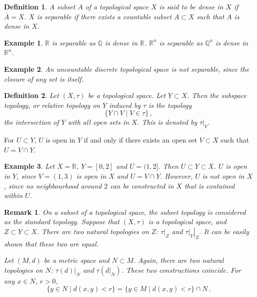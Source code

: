 \documentclass{article}
\theoremstyle{plain}\theoremheaderfont{\normalfont\itshape}\theorembodyfont{\rmfamily}\theoremseparator{.}\newtheorem*{rem}{Remark}\newtheorem*{ex}{Example}\newtheorem*{proof}{Proof}\newtheorem*{altp}{Alternative proof}
\theoremstyle{plain}\theoremheaderfont{\normalfont\bfseries}\theorembodyfont{\rmfamily}\theoremseparator{.}\newtheorem{thm}{Theorem}[section]\newtheorem{lem}[thm]{Lemma}\newtheorem{prop}[thm]{Proposition}\newtheorem*{cor}{Corollary}\newtheorem{defn}[thm]{Definition}\newtheorem{clm}[thm]{Claim}\newtheorem{clminproof}{Claim}
\theoremstyle{break}\theoremheaderfont{\normalfont\itshape}\theorembodyfont{\rmfamily}\theoremseparator{.\medskip}\newtheorem*{proofskip}{Proof}\newtheorem*{exs}{Examples}\newtheorem*{rems}{Remarks}
\theoremstyle{break}\theoremheaderfont{\normalfont\bfseries}\theorembodyfont{\rmfamily}\theoremseparator{.\medskip}\newtheorem{lemskip}[thm]{Lemma}\newtheorem{defnskip}[thm]{Definition}\newtheorem{propskip}[thm]{Proposition}\newtheorem{thmskip}[thm]{Theorem}
\begin{document}
    \begin{defn}
        A subset \(A\) of a topological space \(X\) is said to be \textit{dense} in \(X\) if \(\bar{A}=X\). \(X\) is \textit{separable} if there exists a countable subset \(A\subset X\) such that \(A\) is dense in \(X\).
    \end{defn}
    \begin{ex}
        \(\mathbb{R}\) is separable as \(\mathbb{Q}\) is dense in \(\mathbb{R}\). \(\mathbb{R}^n\) is separable as \(\mathbb{Q}^n\) is dense in \(\mathbb{R}^n\).
    \end{ex}

    \begin{ex}
        An uncountable discrete topological space is not separable, since the closure of any set is itself.
    \end{ex}

    \begin{defn}
        Let \((X,\tau)\) be a topological space. Let \(Y\subset X\). Then the \textit{subspace topology}, or \textit{relative topology} on \(Y\) induced by \(\tau\) is the topology
        \[\{Y\cap V\mid V\in\tau\}\,,\]
        the intersection of \(Y\) with all open sets in \(X\). This is denoted by \(\tau|_Y\).
    \end{defn}

    For \(U\subset Y\), \(U\) is open in \(Y\) if and only if there exists an open set \(V\subset X\) such that \(U=V\cap Y\).

    \begin{ex}
        Let \(X=\mathbb{R}\), \(Y=[0,2]\) and \(U=(1,2]\). Then \(U\subset Y\subset X\). \(U\) is open in \(Y\), since \(V=(1,3)\) is open in \(X\) and \(U=V\cap Y\). However, \(U\) is not open in \(X\), since no neighbourhood around \(2\) can be constructed in \(X\) that is contained within \(U\).
    \end{ex}
    \begin{rem}
        On a subset of a topological space, the subset topology is considered as the standard topology. Suppose that \((X,\tau)\) is a topological space, and \(Z\subset Y\subset X\). There are two natural topologies on \(Z\): \(\tau|_Z\) and \(\left.\tau|_Y\right|_Z\). It can be easily shown that these two are equal.

        Let \((M,d)\) be a metric space and \(N\subset M\). Again, there are two natural topologies on \(N\): \(\tau(d)|_N\) and \(\tau(d|_N)\). These two constructions coincide. For any \(x\in N\), \(r>0\),
        \[\{y\in N\mid d(x,y)<r\}=\{y\in M\mid d(x,y)<r\}\cap N\,.\]
    \end{rem}
\end{document}
